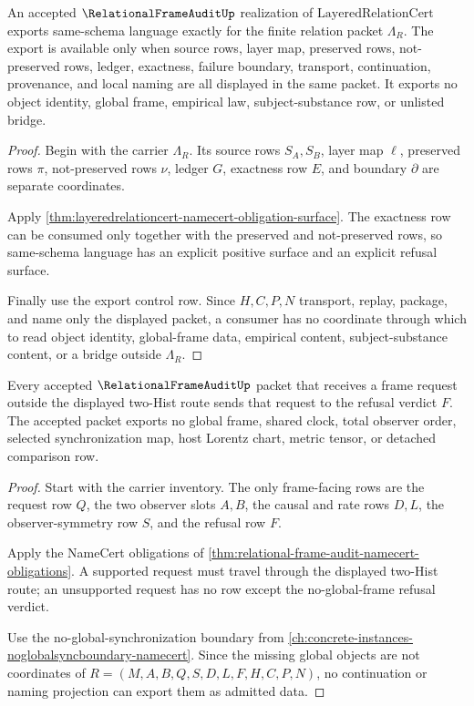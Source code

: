 \begin{theorem}
\label{thm:layeredrelationcert-finite-relation-exactness}
An accepted $\RelationalFrameAuditUp$ realization of $\mathrm{LayeredRelationCert}$ exports same-schema language exactly for the finite relation packet $\Lambda_R$. The export is available only when source rows, layer map, preserved rows, not-preserved rows, ledger, exactness, failure boundary, transport, continuation, provenance, and local naming are all displayed in the same packet. It exports no object identity, global frame, empirical law, subject-substance row, or unlisted bridge.
\end{theorem}
\begin{proof}
Begin with the carrier $\Lambda_R$. Its source rows $S_A,S_B$, layer map $\ell$, preserved rows $\pi$, not-preserved rows $\nu$, ledger $G$, exactness row $E$, and boundary $\partial$ are separate coordinates.

Apply \autoref{thm:layeredrelationcert-namecert-obligation-surface}. The exactness row can be consumed only together with the preserved and not-preserved rows, so same-schema language has an explicit positive surface and an explicit refusal surface.

Finally use the export control row. Since $H,C,P,N$ transport, replay, package, and name only the displayed packet, a consumer has no coordinate through which to read object identity, global-frame data, empirical content, subject-substance content, or a bridge outside $\Lambda_R$.
\end{proof}

\begin{theorem}
\label{thm:relational-frame-audit-no-global-frame-refusal}
Every accepted $\RelationalFrameAuditUp$ packet that receives a frame request outside the displayed two-Hist route sends that request to the refusal verdict $F$. The accepted packet exports no global frame, shared clock, total observer order, selected synchronization map, host Lorentz chart, metric tensor, or detached comparison row.
\end{theorem}
\begin{proof}
Start with the carrier inventory. The only frame-facing rows are the request row $Q$, the two observer slots $A,B$, the causal and rate rows $D,L$, the observer-symmetry row $S$, and the refusal row $F$.

Apply the NameCert obligations of \autoref{thm:relational-frame-audit-namecert-obligations}. A supported request must travel through the displayed two-Hist route; an unsupported request has no row except the no-global-frame refusal verdict.

Use the no-global-synchronization boundary from \autoref{ch:concrete-instances-noglobalsyncboundary-namecert}. Since the missing global objects are not coordinates of $R=(M,A,B,Q,S,D,L,F,H,C,P,N)$, no continuation or naming projection can export them as admitted data.
\end{proof}

